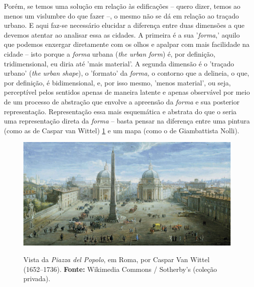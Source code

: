 \documentclass[twoside, 12pt, english,italian,latin,greek,french,spanish,brazil]{book}
\begin{document}
     Porém, se temos uma solução em relação às edificações – quero dizer, temos ao menos um vislumbre do que fazer –, o mesmo não se dá em relação ao traçado urbano. E aqui faz-se necessário elucidar a diferença entre duas dimensões a que devemos atentar ao analisar essa as cidades. A primeira é a sua '\textit{forma},' aquilo que podemos enxergar diretamente com os olhos e apalpar com mais facilidade na cidade – isto porque a \textit{forma} urbana (\textit{the urban form}) é, por definição, tridimensional, eu diria até 'mais material'. A segunda dimensão é o 'traçado urbano' (\textit{the urban shape}), o 'formato' da \textit{forma,} o contorno que a delineia, o que, por definição, é bidimensional, e, por isso mesmo, 'menos material', ou seja, perceptível pelos sentidos apenas de maneira latente e apenas observável por meio de um processo de abstração que envolve a apreensão da \textit{forma} e sua posterior representação. Representação essa mais esquemática e abstrata do que o seria uma representação direta da \textit{forma} – basta pensar na diferença entre uma pintura (como as de Caspar van Wittel) 
     \ref{fig:exemplo}
      e um mapa (como o de Giambattista Nolli). %

    \begin{figure}[h]
        \centering
        \includegraphics[width=1\textwidth]{Pictures/popolo.jpeg}
        \label{fig:exemplo}
        \captionsetup{labelfont=bf}
        \caption{Vista da \textit{Piazza del Popolo}, em Roma, por Caspar Van Wittel (1652–1736). \textbf{Fonte:} Wikimedia Commons / Sotherby's (coleção privada).}
    \end{figure} 
\end{document}
